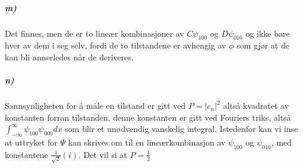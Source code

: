 \documentclass[11pt, A4paper,norsk]{article}
\begin{document}
			\subparagraph{m)}
				\begin{flushleft}
Det finnes, men de er to lineær kombinasjoner av $C \psi_{100}$ og $D \psi_{010}$ og ikke bare hver av dem i seg selv, fordi de to tilstandene er avhengig av $\phi$ som gjør at de kan bli annerledes når de deriveres.
				\end{flushleft}









			\subparagraph{n)}
				\begin{flushleft}
Sannsynligheten for å måle en tilstand er gitt ved $P = |c_n|^2$ altså kvadratet av konstanten forran tilstanden. denne konstanten er gitt ved Fouriers triks, altså $\int_{- \infty}^{\infty} \psi_{100} \psi_{000} dx$ som blir et unødvendig vanskelig integral. Istedenfor kan vi inse at uttryket for $\Psi$ kan skrives om til en lineærkombinasjon av $\psi_{100}$ og $\psi_{010}$, med konstantene $\frac{1}{\sqrt{2}}(i)$. Det vil si at $P = \frac{1}{2}$
				\end{flushleft}
\end{document}
